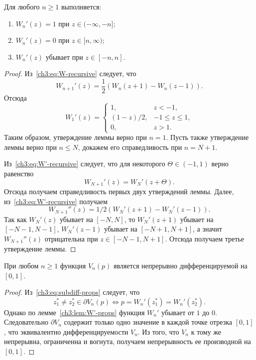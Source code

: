 {\begin{lemma}\label{ch3:lem:W'-props}
  Для любого $n \geqslant 1$ выполняется\textnormal{:}
  \begin{enumerate}
  \item $W_n'(z) = 1$ при $z \in (-\infty, -n];$
  \item $W_n'(z) = 0$ при $z \in [n, \infty);$
  \item $W_n'(z)$ убывает при $z \in [-n, n].$
  \end{enumerate}
\end{lemma}
\begin{proof}
  Из~\eqref{ch3:eq:W-recursive} следует, что
  \begin{equation}\label{ch3:eq:W'-recursive}
    W_{n+1}'(z) = \frac{1}{2} \left( W_n(z + 1) - W_n(z - 1) \right).
  \end{equation}
  Отсюда
  \begin{equation}\label{ch3:eq:W1'}
    W_1'(z) =
    \begin{cases}
      1, &z < -1, \\
      (1-z)/2,  &-1 \leqslant z \leqslant 1, \\
      0, &z > 1.
    \end{cases}
  \end{equation}
  Таким образом, утверждение леммы верно при $n = 1$.
  Пусть также утверждение леммы верно при $n \leqslant N$, докажем его справедливость при $n = N + 1$.

  Из~\eqref{ch3:eq:W'-recursive} следует, что для некоторого $\Theta \in (-1,1)$ верно равенство
  \[
    W_{N+1}'(z) = W_{N}'(z + \Theta).
  \]
  Отсюда получаем справедливость первых двух утверждений леммы.
  Далее, из~\eqref{ch3:eq:W'-recursive} получаем 
  \[
    W_{N+1}''(z) = 1/2 \left( W_{N}'(z + 1) - W_{N}'(z - 1) \right).
  \]
  Так как $W_N'(z)$ убывает на $[-N, N]$, то $W_N'(z + 1)$ убывает на $[-N-1, N - 1]$, $W_N'(z - 1)$ убывает на $[-N + 1, N+1]$, а значит $W_{N+1}''(z)$ отрицательна при $z \in [-N-1, N+1]$.
  Отсюда получаем третье утверждение леммы.
\end{proof}

\begin{proposition}
  При любом $n \geqslant 1$ функция $V_n(p)$ является непрерывно дифференцируемой на $[0, 1]$.
\end{proposition}
\begin{proof}
  Из~\eqref{ch3:eq:subdiff-props} следует, что
  \begin{equation*}
    z_1^* \neq z_2^* \in \partial V_n(p) \iff p = W_n'(z_1^*) = W_n'(z_2^*).
  \end{equation*}
  Однако по лемме~\ref{ch3:lem:W'-props} функция $W_n'$ убывает от $1$ до $0$.
  Следовательно $\partial V_n$ содержит только одно значение в каждой точке отрезка $[0, 1]$, что эквивалентно дифференцируемости $V_n$.
  Из того, что $V_n$ к тому же непрерывна, ограниченна и вогнута, получаем непрерывность ее производной на $[0, 1]$.
\end{proof}

}
